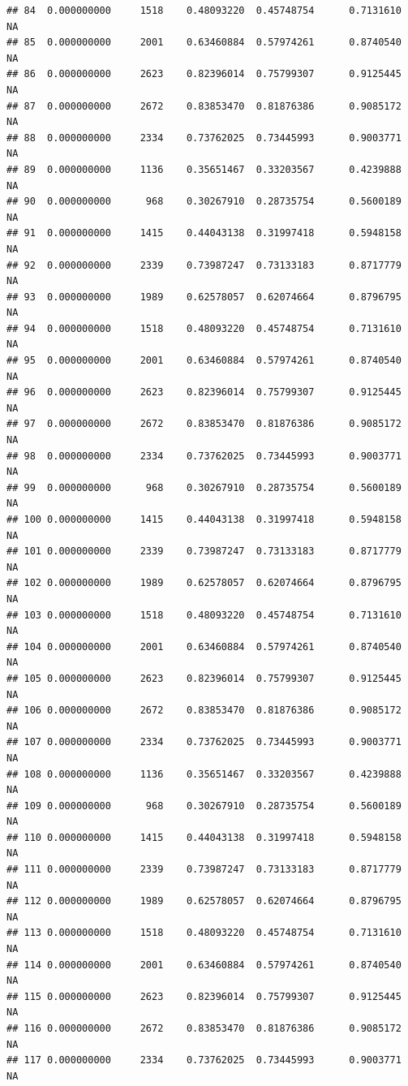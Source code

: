 \documentclass[
]{article}
\begin{document}
\begin{verbatim}
## 84  0.000000000     1518    0.48093220  0.45748754      0.7131610      NA
## 85  0.000000000     2001    0.63460884  0.57974261      0.8740540      NA
## 86  0.000000000     2623    0.82396014  0.75799307      0.9125445      NA
## 87  0.000000000     2672    0.83853470  0.81876386      0.9085172      NA
## 88  0.000000000     2334    0.73762025  0.73445993      0.9003771      NA
## 89  0.000000000     1136    0.35651467  0.33203567      0.4239888      NA
## 90  0.000000000      968    0.30267910  0.28735754      0.5600189      NA
## 91  0.000000000     1415    0.44043138  0.31997418      0.5948158      NA
## 92  0.000000000     2339    0.73987247  0.73133183      0.8717779      NA
## 93  0.000000000     1989    0.62578057  0.62074664      0.8796795      NA
## 94  0.000000000     1518    0.48093220  0.45748754      0.7131610      NA
## 95  0.000000000     2001    0.63460884  0.57974261      0.8740540      NA
## 96  0.000000000     2623    0.82396014  0.75799307      0.9125445      NA
## 97  0.000000000     2672    0.83853470  0.81876386      0.9085172      NA
## 98  0.000000000     2334    0.73762025  0.73445993      0.9003771      NA
## 99  0.000000000      968    0.30267910  0.28735754      0.5600189      NA
## 100 0.000000000     1415    0.44043138  0.31997418      0.5948158      NA
## 101 0.000000000     2339    0.73987247  0.73133183      0.8717779      NA
## 102 0.000000000     1989    0.62578057  0.62074664      0.8796795      NA
## 103 0.000000000     1518    0.48093220  0.45748754      0.7131610      NA
## 104 0.000000000     2001    0.63460884  0.57974261      0.8740540      NA
## 105 0.000000000     2623    0.82396014  0.75799307      0.9125445      NA
## 106 0.000000000     2672    0.83853470  0.81876386      0.9085172      NA
## 107 0.000000000     2334    0.73762025  0.73445993      0.9003771      NA
## 108 0.000000000     1136    0.35651467  0.33203567      0.4239888      NA
## 109 0.000000000      968    0.30267910  0.28735754      0.5600189      NA
## 110 0.000000000     1415    0.44043138  0.31997418      0.5948158      NA
## 111 0.000000000     2339    0.73987247  0.73133183      0.8717779      NA
## 112 0.000000000     1989    0.62578057  0.62074664      0.8796795      NA
## 113 0.000000000     1518    0.48093220  0.45748754      0.7131610      NA
## 114 0.000000000     2001    0.63460884  0.57974261      0.8740540      NA
## 115 0.000000000     2623    0.82396014  0.75799307      0.9125445      NA
## 116 0.000000000     2672    0.83853470  0.81876386      0.9085172      NA
## 117 0.000000000     2334    0.73762025  0.73445993      0.9003771      NA

\end{verbatim}
\end{document}
